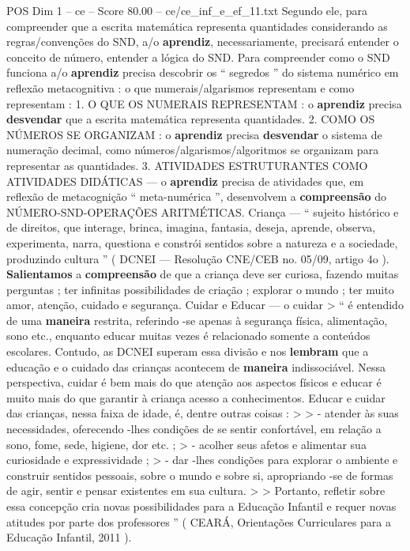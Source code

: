 \begin{textsample}{POS Dim 1 – ce – Score 80.00 – ce/ce\_inf\_e\_ef\_11.txt}
Segundo ele, para compreender que a escrita matemática representa quantidades considerando as regras/convenções do SND, a/o \textbf{aprendiz}, necessariamente, precisará entender o conceito de número, entender a lógica do SND.
Para compreender como o SND funciona a/o \textbf{aprendiz} precisa descobrir os “ segredos ” do sistema numérico em reflexão metacognitiva : o que numerais/algarismos representam e como representam : 1.
O QUE OS NUMERAIS REPRESENTAM : o \textbf{aprendiz} precisa \textbf{desvendar} que a escrita matemática representa quantidades. 2.
COMO OS NÚMEROS SE ORGANIZAM : o \textbf{aprendiz} precisa \textbf{desvendar} o sistema de numeração decimal, como números/algarismos/algoritmos se organizam para representar as quantidades. 3.
ATIVIDADES ESTRUTURANTES COMO ATIVIDADES DIDÁTICAS — o \textbf{aprendiz} precisa de atividades que, em reflexão de metacognição “ meta-numérica ”, desenvolvem a \textbf{compreensão} do NÚMERO-SND-OPERAÇÕES ARITMÉTICAS.
Criança — “ sujeito histórico e de direitos, que interage, brinca, imagina, fantasia, deseja, aprende, observa, experimenta, narra, questiona e constrói sentidos sobre a natureza e a sociedade, produzindo cultura ” ( DCNEI — Resolução CNE/CEB no. 05/09, artigo 4o ). \textbf{Salientamos} a \textbf{compreensão} de que a criança deve ser curiosa, fazendo muitas perguntas ; ter infinitas possibilidades de criação ; explorar o mundo ; ter muito amor, atenção, cuidado e segurança.
Cuidar e Educar — o cuidar > “ é entendido de uma \textbf{maneira} restrita, referindo -se apenas à segurança física, alimentação, sono etc., enquanto educar muitas vezes é relacionado somente a conteúdos escolares.
Contudo, as DCNEI superam essa divisão e nos \textbf{lembram} que a educação e o cuidado das crianças acontecem de \textbf{maneira} indissociável.
Nessa perspectiva, cuidar é bem mais do que atenção aos aspectos físicos e educar é muito mais do que garantir à criança acesso a conhecimentos.
Educar e cuidar das crianças, nessa faixa de idade, é, dentre outras coisas : > > - atender às suas necessidades, oferecendo -lhes condições de se sentir confortável, em relação a sono, fome, sede, higiene, dor etc. ; > - acolher seus afetos e alimentar sua curiosidade e expressividade ; > - dar -lhes condições para explorar o ambiente e construir sentidos pessoais, sobre o mundo e sobre si, apropriando -se de formas de agir, sentir e pensar existentes em sua cultura. > > Portanto, refletir sobre essa concepção cria novas possibilidades para a Educação Infantil e requer novas atitudes por parte dos professores ” ( CEARÁ, Orientações Curriculares para a Educação Infantil, 2011 ).

\end{textsample}
